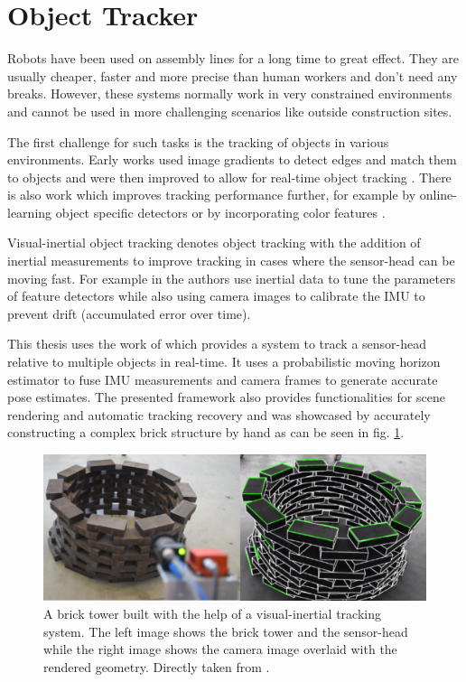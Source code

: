 \section{Object Tracker} \label{sec:objectTracker}

Robots have been used on assembly lines for a long time to great effect. They are usually cheaper, faster and more precise than human workers and don't need any breaks. However, these systems normally work in very constrained environments and cannot be used in more challenging scenarios like outside construction sites. 

The first challenge for such tasks is the tracking of objects in various environments. Early works used image gradients to detect edges and match them to objects \cite{GradientObjectTracking} and were then improved to allow for real-time object tracking \cite{RealTimeObjectTracking}. There is also work which improves tracking performance further, for example by online-learning object specific detectors \cite{OnlineLearningDetectors} or by incorporating color features \cite{ColorObjectTracking}.

Visual-inertial object tracking denotes object tracking with the addition of inertial measurements to improve tracking in cases where the sensor-head can be moving fast. For example in \cite{VisualInertialObjectTracking} the authors use inertial data to tune the parameters of feature detectors while also using camera images to calibrate the IMU to prevent drift (accumulated error over time).

This thesis uses the work of \cite{ViObjectTracker} which provides a system to track a sensor-head relative to multiple objects in real-time. It uses a probabilistic moving horizon estimator to fuse IMU measurements and camera frames to generate accurate pose estimates. The presented framework also provides functionalities for scene rendering and automatic tracking recovery and was showcased by accurately constructing a complex brick structure by hand as can be seen in fig. \ref{fig:objectTrackerExample}.

\begin{figure}
    \centering
    \includegraphics[width=0.9\linewidth]{figures/object_tracker_example.png}
    \caption[Object Tracker Brick Tower Showcase]{A brick tower built with the help of a visual-inertial tracking system. The left image shows the brick tower and the sensor-head while the right image shows the camera image overlaid with the rendered geometry. Directly taken from \cite{ViObjectTracker}.}
      \label{fig:objectTrackerExample}
\end{figure}


